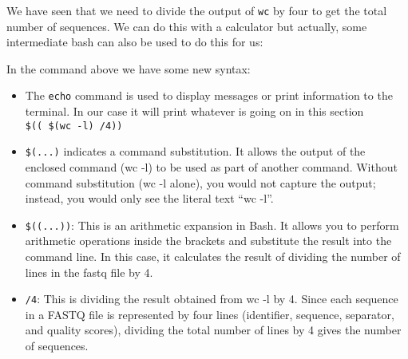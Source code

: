 \documentclass[
  letterpaper,
  DIV=11,
  numbers=noendperiod]{scrreprt}
\newenvironment{Shaded}{}{}
\newcommand{\AttributeTok}[1]{\textcolor[rgb]{0.84,0.23,0.29}{#1}}
\newcommand{\BuiltInTok}[1]{\textcolor[rgb]{0.84,0.23,0.29}{#1}}
\newcommand{\DecValTok}[1]{\textcolor[rgb]{0.00,0.36,0.77}{#1}}
\newcommand{\FunctionTok}[1]{\textcolor[rgb]{0.44,0.26,0.76}{#1}}
\newcommand{\KeywordTok}[1]{\textcolor[rgb]{0.84,0.23,0.29}{#1}}
\newcommand{\NormalTok}[1]{\textcolor[rgb]{0.14,0.16,0.18}{#1}}
\newcommand{\OperatorTok}[1]{\textcolor[rgb]{0.14,0.16,0.18}{#1}}
\newcommand{\VariableTok}[1]{\textcolor[rgb]{0.89,0.38,0.04}{#1}}
\providecommand{\tightlist}{%
  \setlength{\itemsep}{0pt}\setlength{\parskip}{0pt}}\usepackage{longtable,booktabs,array}
\begin{document}
\begin{tcolorbox}[enhanced jigsaw, colframe=quarto-callout-tip-color-frame, colbacktitle=quarto-callout-tip-color!10!white, opacitybacktitle=0.6, breakable, titlerule=0mm, colback=white, toptitle=1mm, leftrule=.75mm, opacityback=0, coltitle=black, left=2mm, toprule=.15mm, bottomtitle=1mm, rightrule=.15mm, title=\textcolor{quarto-callout-tip-color}{\faLightbulb}\hspace{0.5em}{Avanced Tip: better counting}, bottomrule=.15mm, arc=.35mm]

We have seen that we need to divide the output of \texttt{wc} by four to
get the total number of sequences. We can do this with a calculator but
actually, some intermediate bash can also be used to do this for us:

\begin{Shaded}
\end{Shaded}

In the command above we have some new syntax:

\begin{itemize}
\tightlist
\item
  The \texttt{echo} command is used to display messages or print
  information to the terminal. In our case it will print whatever is
  going on in this section \texttt{\$((\ \$(wc\ -l)\ /4))}
\item
  \texttt{\$(...)} indicates a command substitution. It allows the
  output of the enclosed command (wc -l) to be used as part of another
  command. Without command substitution (wc -l alone), you would not
  capture the output; instead, you would only see the literal text ``wc
  -l''.
\item
  \texttt{\$((...))}: This is an arithmetic expansion in Bash. It allows
  you to perform arithmetic operations inside the brackets and
  substitute the result into the command line. In this case, it
  calculates the result of dividing the number of lines in the fastq
  file by 4.
\item
  \texttt{/4}: This is dividing the result obtained from wc -l by 4.
  Since each sequence in a FASTQ file is represented by four lines
  (identifier, sequence, separator, and quality scores), dividing the
  total number of lines by 4 gives the number of sequences.
\end{itemize}

\end{tcolorbox}
\end{document}
